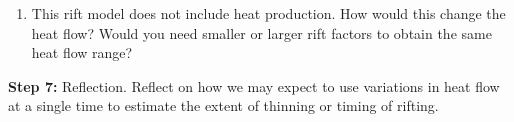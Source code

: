 \documentclass[11pt,a4paper,final]{article}
\begin{document}
\begin{enumerate}
\begin{enumerate}
        \item This rift model does not include heat production.  How would this change the heat flow?  Would you need smaller or larger rift factors to obtain the same heat flow range?
    \end{enumerate}

    \vspace{1em}
    {\bf Step 7:} Reflection.
    Reflect on how we may expect to use variations in heat flow at a single time to
    estimate the extent of thinning or timing of rifting.
\end{enumerate}
\end{document}
